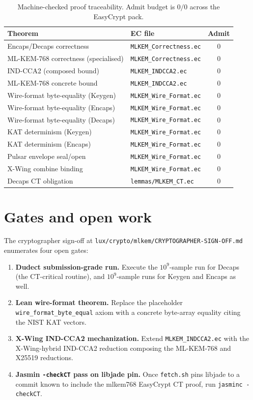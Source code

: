 \documentclass[11pt,a4paper]{article}
\begin{document}
\begin{table}[h]
\centering
\small
\begin{tabular}{llc}
\toprule
Theorem & EC file & Admit\\
\midrule
Encaps/Decaps correctness & \texttt{MLKEM\_Correctness.ec} & 0\\
ML-KEM-768 correctness (specialised) & \texttt{MLKEM\_Correctness.ec} & 0\\
IND-CCA2 (composed bound) & \texttt{MLKEM\_INDCCA2.ec} & 0\\
ML-KEM-768 concrete bound & \texttt{MLKEM\_INDCCA2.ec} & 0\\
Wire-format byte-equality (Keygen) & \texttt{MLKEM\_Wire\_Format.ec} & 0\\
Wire-format byte-equality (Encaps) & \texttt{MLKEM\_Wire\_Format.ec} & 0\\
Wire-format byte-equality (Decaps) & \texttt{MLKEM\_Wire\_Format.ec} & 0\\
KAT determinism (Keygen) & \texttt{MLKEM\_Wire\_Format.ec} & 0\\
KAT determinism (Encaps) & \texttt{MLKEM\_Wire\_Format.ec} & 0\\
Pulsar envelope seal/open & \texttt{MLKEM\_Wire\_Format.ec} & 0\\
X-Wing combine binding & \texttt{MLKEM\_Wire\_Format.ec} & 0\\
Decaps CT obligation & \texttt{lemmas/MLKEM\_CT.ec} & 0\\
\bottomrule
\end{tabular}
\caption{Machine-checked proof traceability. Admit budget is
$0/0$ across the EasyCrypt pack.}
\label{tab:mlkem-traceability}
\end{table}

\section{Gates and open work}\label{sec:gates}

The cryptographer sign-off at
\texttt{lux/crypto/mlkem/CRYPTOGRAPHER-SIGN-OFF.md} enumerates four
open gates:

\begin{enumerate}
\item \textbf{Dudect submission-grade run.} Execute the $10^9$-sample
  run for Decaps (the CT-critical routine), and $10^9$-sample runs
  for Keygen and Encaps as well.
\item \textbf{Lean wire-format theorem.} Replace the placeholder
  \texttt{wire\_format\_byte\_equal} axiom with a concrete byte-array
  equality citing the NIST KAT vectors.
\item \textbf{X-Wing IND-CCA2 mechanization.} Extend
  \texttt{MLKEM\_INDCCA2.ec} with the X-Wing-hybrid IND-CCA2 reduction
  composing the ML-KEM-768 and X25519 reductions.
\item \textbf{Jasmin \texttt{-checkCT} pass on libjade pin.} Once
  \texttt{fetch.sh} pins libjade to a commit known to include the
  mlkem768 EasyCrypt CT proof, run \texttt{jasminc -checkCT}.
\end{enumerate}
\end{document}
